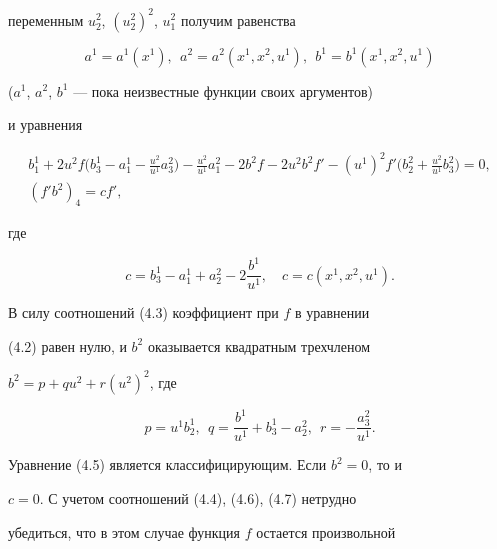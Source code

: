 переменным $u^2_2$, $(u^2_2)^2$, $u^2_1$ получим равенства 


\begin{equation} 


a^1=a^1(x^1),\ \ a^2=a^2(x^1,x^2,u^1),\ \ 


b^1=b^1(x^1,x^2,u^1) 


\end{equation} 


($a^1$, $a^2$, $b^1$ --- пока неизвестные функции своих аргументов) 


и уравнения 


\begin{gather} 


b^1_1+2u^2f\bigg(b^1_3-a^1_1-\frac{u^2}{u^1}a^2_3\bigg) 


-\frac{u^2}{u^1}a^2_1-2b^2f-2u^2b^2f'-(u^1)^2f'\bigg( 


b^2_2+\frac{u^2}{u^1}b^2_3\bigg)=0,\\ 


(f' b^2)_4=cf', 


\end{gather} 


где 


\begin{equation} 


c=b^1_3-a^1_1+a^2_2-2\frac{b^1}{u^1},\quad 


c=c(x^1,x^2,u^1). 


\end{equation} 


 


В силу соотношений (4.3) коэффициент при $f$ в уравнении 


(4.2) равен нулю, и $b^2$ оказывается квадратным трехчленом 


$b^2=p+qu^2+r(u^2)^2$, где 


\begin{equation} 


p=u^1b^1_2,\ \ q=\frac{b^1}{u^1}+b^1_3-a^2_2,\ \ 


r=-\frac{a^2_3}{u^1}. 


\end{equation} 


Уравнение (4.5) является классифицирующим. Если $b^2=0$, то и 


$c=0$. С учетом соотношений (4.4), (4.6), (4.7) нетрудно 


убедиться, что в этом случае функция $f$ остается произвольной 


